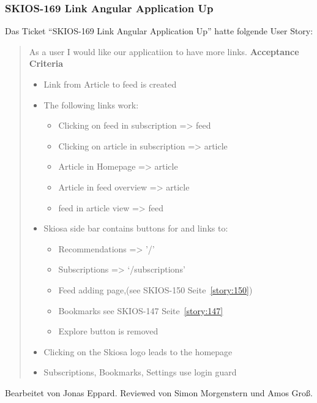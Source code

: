 \subsubsection{SKIOS-169 Link Angular Application Up}
Das Ticket \enquote{SKIOS-169 Link Angular Application Up} hatte folgende User Story:
\begin{quotation}
    As a user I would like our applicatiion to have more links.
\textbf{Acceptance Criteria}
\begin{itemize}
    \item Link from Article to feed is created
    \item The following links work:
    \begin{itemize}
        \item Clicking on feed in subscription => feed
        \item Clicking on article in subscription => article
        \item Article in Homepage => article
        \item Article in feed overview => article
        \item feed in article view => feed
    \end{itemize}
    \item Skiosa side bar contains buttons for and links to: 
    \begin{itemize}
        \item Recommendations => '/'
        \item Subscriptions => ‘/subscriptions’
        \item Feed adding page,(see SKIOS-150 Seite~\ref{story:150}) 
        \item Bookmarks see SKIOS-147 Seite~\ref{story:147}
        \item Explore button is removed
    \end{itemize}
    \item Clicking on the Skiosa logo leads to the homepage
    \item Subscriptions, Bookmarks, Settings use login guard
\end{itemize}
\end{quotation}
Bearbeitet von Jonas Eppard.
Reviewed von Simon Morgenstern und Amos Groß.

